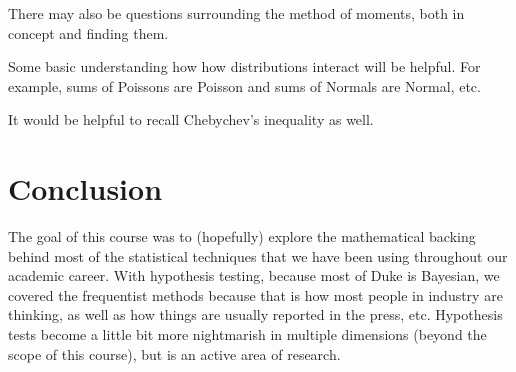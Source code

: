 \documentclass[titlepage, 12pt, leqno]{article}
\begin{document}
There may also be questions surrounding the method of moments, both in concept
and finding them.

Some basic understanding how how distributions interact will be helpful. For
example, sums of Poissons are Poisson and sums of Normals are Normal, etc.

It would be helpful to recall Chebychev's inequality as well.

\pagebreak
\section{Conclusion}
The goal of this course was to (hopefully) explore the mathematical backing 
behind most of the statistical techniques that we have been using throughout
our academic career. With hypothesis testing, because most of Duke is Bayesian,
we covered the frequentist methods because that is how most people in industry
are thinking, as well as how things are usually reported in the press, etc.
Hypothesis tests become a little bit more nightmarish in multiple dimensions
(beyond the scope of this course), but is an active area of research.
\end{document}
